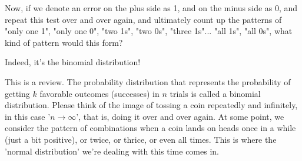 \documentclass{ltjbook}
\begin{document}


Now, if we denote an error on the plus side as 1, and on the minus side as 0, and repeat this test over and over again, and ultimately count up the patterns of "only one 1", "only one 0", "two 1s", "two 0s", "three 1s"... "all 1s", "all 0s", what kind of pattern would this form?

Indeed, it's the binomial distribution!

This is a review. The probability distribution that represents the probability of getting $k$ favorable outcomes (successes) in $n$ trials is called a binomial distribution.
Please think of the image of tossing a coin repeatedly and infinitely, in this case '$n \to \infty$', that is, doing it over and over again.
At some point, we consider the pattern of combinations when a coin lands on heads once in a while (just a bit positive), or twice, or thrice, or even all times. This is where the 'normal distribution' we're dealing with this time comes in.
\end{document}
